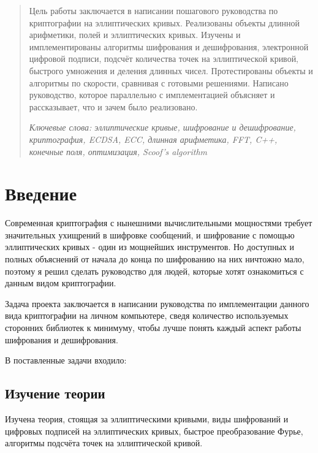 \documentclass{article}
\begin{document}
\makeTitlePage

\tableofcontents
\newpage
\begin{abstract}
  Цель работы заключается в написании пошагового руководства по криптографии на эллиптических кривых. Реализованы объекты длинной арифметики, полей и эллиптических кривых. Изучены и имплементированы алгоритмы шифрования и дешифрования, электронной цифровой подписи, подсчёт количества точек на эллиптической кривой, быстрого умножения и деления длинных чисел. Протестированы объекты и алгоритмы по скорости, сравнивая с готовыми решениями. Написано руководство, которое параллельно с имплементацией объясняет и рассказывает, что и зачем было реализовано.

  \textit{Ключевые слова: эллиптические кривые, шифрование и дешифрование, криптография, ECDSA, ECC, длинная арифметика, FFT, C++, конечные поля, оптимизация, Scoof's algorithm}
\end{abstract}
\section{Введение}
Современная криптография с нынешними вычислительными мощностями требует значительных ухищрений в шифровке сообщений, и шифрование с помощью эллиптических кривых - один из мощнейших инструментов. Но доступных и полных объяснений от начала до конца по шифрованию на них ничтожно мало, поэтому я решил сделать руководство для людей, которые хотят ознакомиться с данным видом криптографии.

Задача проекта заключается в написании руководства по имплементации данного вида криптографии на личном компьютере, сведя количество используемых сторонних библиотек к минимуму, чтобы лучше понять каждый аспект работы шифрования и дешифрования.

В поставленные задачи входило:
\subsection*{Изучение теории}
Изучена теория, стоящая за эллиптическими кривыми, виды шифрований и цифровых подписей на эллиптических кривых, быстрое преобразование Фурье, алгоритмы подсчёта точек на эллиптической кривой. 
\end{document}
